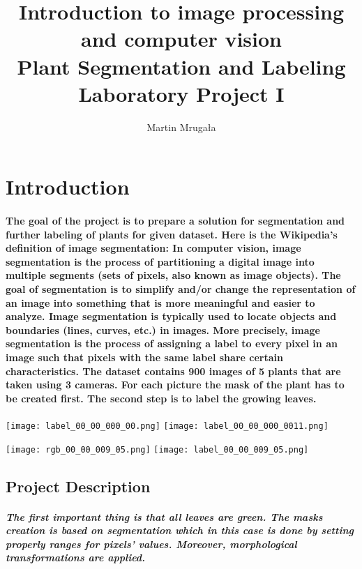\documentclass[12pt]{article}
\title{
\large Introduction to image processing and computer vision \\
\LARGE \textbf{Plant Segmentation and Labeling} \\
Laboratory Project I
}
\author{Martin Mrugała}
\begin{document}
\maketitle
\newpage
\tableofcontents

\thispagestyle{empty}

\newpage

\clearpage
{}

\section{Introduction}

\paragraph{
The goal of the project is to prepare a solution for segmentation and further labeling of plants for given dataset. Here is the Wikipedia’s definition of image segmentation: In computer vision, image segmentation is the process of partitioning a digital image into multiple segments (sets of pixels, also known as image objects). The goal of segmentation is to simplify and/or change the representation of an image into something that is more meaningful and easier to analyze. Image segmentation is typically used to locate objects and boundaries (lines, curves, etc.) in images. More precisely, image segmentation is the process of assigning a label to every pixel in an image such that pixels with the same label share certain characteristics. The dataset contains 900 images of 5 plants that are taken using 3 cameras. For each picture the mask of the plant has to be created first. The second step is to label the growing leaves.
}


\texttt{[image: label\_00\_00\_000\_00.png]}
\label{kej}
\texttt{[image: label\_00\_00\_000\_0011.png]}

\hspace{1cm}
\texttt{[image: rgb\_00\_00\_009\_05.png]}
\label{key}
\texttt{[image: label\_00\_00\_009\_05.png]}

\newpage
\subsection{Project Description}

\subparagraph{
The first important thing is that all leaves are green. The masks creation is based on segmentation which in this case is done by setting properly ranges for pixels’ values. Moreover, morphological transformations are applied. \\\\
}
\end{document}
